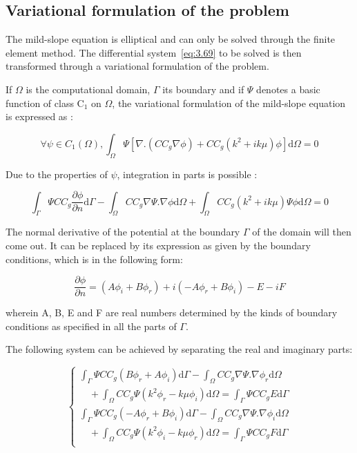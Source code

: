 \subsection{Variational formulation of the problem}

The mild-slope equation is elliptical and can only be solved through the finite
element method. The differential system~\ref{eq:3.69} to be solved is
then transformed through a variational formulation of the problem.

If $\Omega$ is the computational domain, $\Gamma$ its boundary and if
$\Psi$ denotes a basic function of class C${}_{1}$ on $\Omega$, the variational
formulation of the mild-slope equation is expressed as :

\begin{equation}
  \forall \psi \in C_1(\Omega), \int_{\Omega}\Psi[\nabla.(CC_g\nabla\phi)+CC_g(k^2+ik\mu)\phi]\text{d}\Omega = 0
  \label{eq:3.70}
\end{equation}

Due to the properties of $\psi$, integration in parts is possible :

\begin{equation}
  \int_{\Gamma}\Psi CC_g \frac{\partial \phi}{\partial n}\text{d}\Gamma - \int_{\Omega}CC_g\nabla\Psi.\nabla\phi \text{d}\Omega+\int_{\Omega}CC_g(k^2+ik\mu)\Psi\phi \text{d}\Omega = 0
  \label{eq:3.71}
\end{equation}

The normal derivative of the potential at the boundary $\Gamma$ of the domain
will then come out. It can be replaced by its expression as given by the
boundary conditions, which is in the following form:

\begin{equation}
  \frac{\partial \phi}{\partial n} = (A\phi_i + B\phi_r) + i(-A\phi_r+B\phi_i) -E -iF
  \label{eq:3.72}
\end{equation}

wherein A, B, E and F are real numbers determined by the kinds of boundary
conditions as specified in all the parts of $\Gamma$.

The following system can be achieved by separating the real and imaginary parts:

\begin{equation}
  \left\{
    \begin{matrix}
      \int_{\Gamma}\Psi CC_g(B\phi_r + A\phi_i)\text{d}\Gamma -\int_{\Omega}CC_g\nabla\Psi.\nabla\phi_r \text{d}\Omega \\
      \quad +\int_\Omega CC_g\Psi(k^2\phi_r -k\mu\phi_i)\text{d}\Omega = \int_\Gamma\Psi CC_g E \text{d}\Gamma \\

      \int_{\Gamma}\Psi CC_g(-A\phi_r + B\phi_i)\text{d}\Gamma -\int_{\Omega}CC_g\nabla\Psi.\nabla\phi_i \text{d}\Omega \\
      \quad +\int_\Omega CC_g\Psi(k^2\phi_i -k\mu\phi_r)\text{d}\Omega = \int_\Gamma\Psi CC_g F \text{d}\Gamma \\
    \end{matrix}
    \right.
  \label{eq:3.73}
\end{equation}


